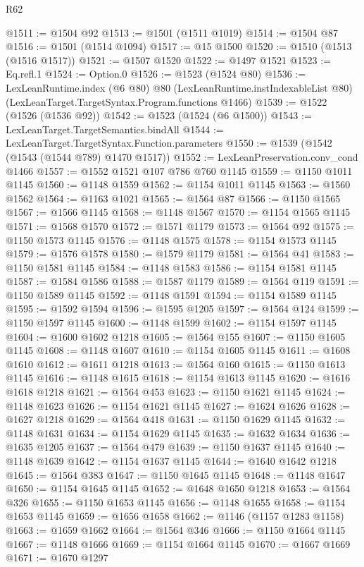 \begin{lexlean}{R62}
\begin{coremodule}
@1511 := @1504 @92
@1513 := @1501 (@1511 @1019)
@1514 := @1504 @87
@1516 := @1501 (@1514 @1094)
@1517 := @15 @1500
@1520 := @1510 (@1513 (@1516 @1517))
@1521 := @1507 @1520
@1522 := @1497 @1521
@1523 := Eq.refl.{1}
@1524 := Option.{0}
@1526 := @1523 (@1524 @80)
@1536 := LexLeanRuntime.index
    (@6 @80)
    @80
    (LexLeanRuntime.instIndexableList @80)
    (LexLeanTarget.TargetSyntax.Program.functions @1466)
@1539 := @1522 (@1526 (@1536 @92))
@1542 := @1523 (@1524 (@6 @1500))
@1543 := LexLeanTarget.TargetSemantics.bindAll
@1544 := LexLeanTarget.TargetSyntax.Function.parameters
@1550 := @1539 (@1542 (@1543 (@1544 @789) @1470 @1517))
@1552 := LexLeanPreservation.conv_cond @1466
@1557 := @1552 @1521 @107 @786 @760 @1145
@1559 := @1150 @1011 @1145
@1560 := @1148 @1559
@1562 := @1154 @1011 @1145
@1563 := @1560 @1562
@1564 := @1163 @1021
@1565 := @1564 @87
@1566 := @1150 @1565
@1567 := @1566 @1145
@1568 := @1148 @1567
@1570 := @1154 @1565 @1145
@1571 := @1568 @1570
@1572 := @1571 @1179
@1573 := @1564 @92
@1575 := @1150 @1573 @1145
@1576 := @1148 @1575
@1578 := @1154 @1573 @1145
@1579 := @1576 @1578
@1580 := @1579 @1179
@1581 := @1564 @41
@1583 := @1150 @1581 @1145
@1584 := @1148 @1583
@1586 := @1154 @1581 @1145
@1587 := @1584 @1586
@1588 := @1587 @1179
@1589 := @1564 @119
@1591 := @1150 @1589 @1145
@1592 := @1148 @1591
@1594 := @1154 @1589 @1145
@1595 := @1592 @1594
@1596 := @1595 @1205
@1597 := @1564 @124
@1599 := @1150 @1597 @1145
@1600 := @1148 @1599
@1602 := @1154 @1597 @1145
@1604 := @1600 @1602 @1218
@1605 := @1564 @155
@1607 := @1150 @1605 @1145
@1608 := @1148 @1607
@1610 := @1154 @1605 @1145
@1611 := @1608 @1610
@1612 := @1611 @1218
@1613 := @1564 @160
@1615 := @1150 @1613 @1145
@1616 := @1148 @1615
@1618 := @1154 @1613 @1145
@1620 := @1616 @1618 @1218
@1621 := @1564 @453
@1623 := @1150 @1621 @1145
@1624 := @1148 @1623
@1626 := @1154 @1621 @1145
@1627 := @1624 @1626
@1628 := @1627 @1218
@1629 := @1564 @418
@1631 := @1150 @1629 @1145
@1632 := @1148 @1631
@1634 := @1154 @1629 @1145
@1635 := @1632 @1634
@1636 := @1635 @1205
@1637 := @1564 @479
@1639 := @1150 @1637 @1145
@1640 := @1148 @1639
@1642 := @1154 @1637 @1145
@1644 := @1640 @1642 @1218
@1645 := @1564 @383
@1647 := @1150 @1645 @1145
@1648 := @1148 @1647
@1650 := @1154 @1645 @1145
@1652 := @1648 @1650 @1218
@1653 := @1564 @326
@1655 := @1150 @1653 @1145
@1656 := @1148 @1655
@1658 := @1154 @1653 @1145
@1659 := @1656 @1658
@1662 := @1146 (@1157 @1283 @1158)
@1663 := @1659 @1662
@1664 := @1564 @346
@1666 := @1150 @1664 @1145
@1667 := @1148 @1666
@1669 := @1154 @1664 @1145
@1670 := @1667 @1669
@1671 := @1670 @1297

\end{coremodule}
\end{lexlean}
